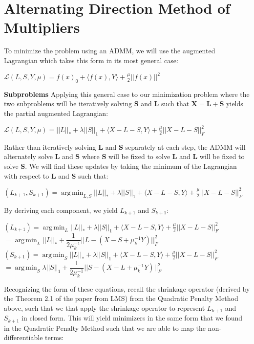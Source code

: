 \documentclass[12pt]{article}
\newcommand{\vL}{{\mathbf{L}}}
\newcommand{\vS}{{\mathbf{S}}}
\newcommand{\vX}{{\mathbf{X}}}
\DeclareMathOperator*{\argmin}{arg\,min} %
\begin{document}
\section*{Alternating Direction Method of Multipliers}
To minimize the problem using an ADMM, we will use the augmented Lagrangian which takes this form in its most general case:
\begin{center}
    $\mathcal{L} (L, S, Y, \mu) = f(x)_0 + \langle f(x), Y \rangle + \frac{\mu}{2}||f(x)||^2$
\end{center}
\newline
\textbf{Subproblems}
\newline
Applying this general case to our minimization problem where the two subproblems will be iteratively solving $\vS$ and $\vL$ such that $\vX = \vL + \vS$ yields the partial augmented Lagrangian:
\begin{center}
    $\mathcal{L} (L, S, Y, \mu) = ||L||_* + \lambda ||S||_1 + \langle X - L - S, Y \rangle + \frac{\mu}{2}||X - L - S||^2_F$
\end{center}
Rather than iteratively solving $\vL$ and $\vS$ separately at each step, the ADMM will alternately solve $\vL$ and $\vS$ where $\vS$ will be fixed to solve $\vL$ and $\vL$ will be fixed to solve $\vS$. We will find these updates by taking the minimum of the Lagrangian with respect to $\vL$ and $\vS$ such that:
\begin{center}
    $(L_{k+1}, S_{k+1}) = \argmin_{L, S} ||L||_* + \lambda ||S||_1 + \langle X - L - S, Y \rangle + \frac{\mu}{2}||X - L - S||^2_F$
\end{center}
By deriving each component, we yield $L_{k+1}$ and $S_{k+1}$:
\begin{center}
     $(L_{k+1}) = \argmin_{L} ||L||_* + \lambda ||S||_1 + \langle X - L - S, Y \rangle + \frac{\mu}{2}||X - L - S||^2_F$
     \newline
     $= \argmin_{L} ||L||_* + \dfrac{1}{2 \mu_k^{-1}} ||L - (X - S + \mu_k^{-1} Y)||^2_F$
     \newline
     $(S_{k+1}) = \argmin_{S} ||L||_* + \lambda ||S||_1 + \langle X - L - S, Y \rangle + \frac{\mu}{2}||X - L - S||^2_F$
     \newline
     $= \argmin_{S} \lambda ||S||_1 + \dfrac{1}{2 \mu_k^{-1}} ||S - (X - L + \mu_k^{-1} Y)||^2_F$
     \newline
\end{center}
Recognizing the form of these equations, recall the shrinkage operator (derived by the Theorem 2.1 of the paper from LMS) from the Quadratic Penalty Method above, such that we that apply the shrinkage operator to represent $L_{k+1}$ and $S_{k+1}$ in closed form. This will yield minimizers in the same form that we found in the Quadratic Penalty Method such that we are able to map the non-differentiable terms:
\end{document}
